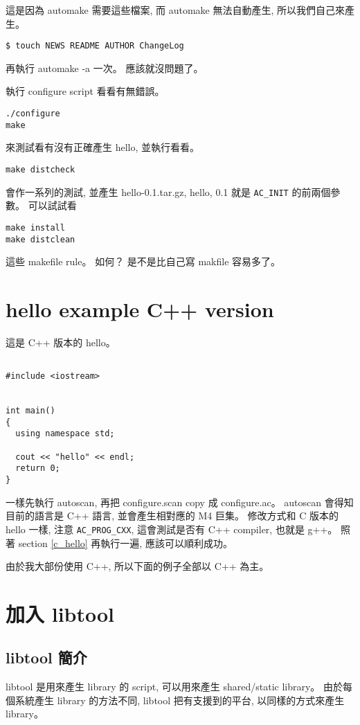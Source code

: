 \documentclass[12pt,a4]{article}
\begin{document}
\begin{CJK}{UTF8}{bsmi}
這是因為 automake 需要這些檔案, 而 automake 無法自動產生,
所以我們自己來產生。
\begin{verbatim}
$ touch NEWS README AUTHOR ChangeLog
\end{verbatim}

再執行 automake -a 一次。
應該就沒問題了。

執行 configure script 看看有無錯誤。

\begin{verbatim}
./configure
make
\end{verbatim}
來測試看有沒有正確產生 hello, 並執行看看。

\begin{verbatim}
make distcheck
\end{verbatim}

會作一系列的測試, 並產生 hello-0.1.tar.gz,
hello, 0.1 就是 \verb+AC_INIT+ 的前兩個參數。
可以試試看

\begin{verbatim}
make install
make distclean
\end{verbatim}

這些 makefile rule。 如何？
是不是比自己寫 makfile 容易多了。


\section{hello example C++ version}

這是 C++ 版本的 hello。
\begin{verbatim}

#include <iostream>


int main()
{
  using namespace std;

  cout << "hello" << endl;
  return 0;
}
\end{verbatim}

一樣先執行 autoscan, 再把 configure.scan copy 成 configure.ac。
autoscan 會得知目前的語言是 C++ 語言, 並會產生相對應的 M4 巨集。
修改方式和 C 版本的 hello 一樣, 注意 \verb+AC_PROG_CXX+,
這會測試是否有 C++ compiler, 也就是 g++。
照著 section \ref{c_hello} 再執行一遍, 應該可以順利成功。

由於我大部份使用 C++, 所以下面的例子全部以 C++ 為主。


\section{加入 libtool}

\subsection{libtool 簡介}
libtool 是用來產生 library 的 script,
可以用來產生 shared/static library。
由於每個系統產生 library 的方法不同, libtool 把有支援到的平台,
以同樣的方式來產生 library。


\end{CJK}
\end{document}
